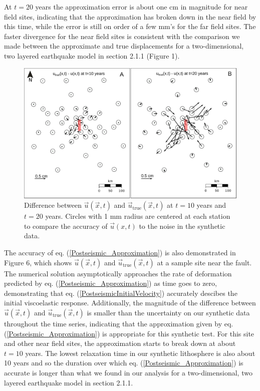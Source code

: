 \documentclass[extra]{gji}
\begin{document}
At $t=20$ years the approximation error is about
one cm in magnitude for near field sites, indicating that the
approximation has broken down in the near field by this time, while
the error is still on order of a few mm's for the far field
sites.  The faster divergence for the near field sites is consistent
with the comparison we made between the approximate and true
displacements for a two-dimensional, two layered earthquake model in
section 2.1.1 (Figure 1).

\begin{figure}\label{figure7}
  \centering
  \includegraphics[scale=0.6]{FinalFigures/Figure7.pdf}
  \caption{Difference between $\vec{u}(\vec{x},t)$ and
    $\vec{u}_{\mathrm{true}}(\vec{x},t)$ at $t=10$ years and $t=20$ years.
    Circles with 1 mm radius are centered at each station to compare
    the accuracy of $\vec{u}(x,t)$ to the noise in
    the synthetic data.}
  \label{Figure 7}
\end{figure}

The accuracy of eq. (\ref{Postseismic_Approximation}) is also
demonstrated in Figure 6, which shows $\vec{u}(\vec{x},t)$ and
$\vec{u}_{\mathrm{true}}(\vec{x},t)$ at a sample site near the fault.
The numerical solution asymptotically approaches the rate of
deformation predicted by eq. (\ref{Postseismic_Approximation}) as time
goes to zero, demonstrating that
eq. (\ref{PostseismicInitialVelocity}) accurately descibes the initial
viscoelastic response.  Additionally, the magnitude of the difference
between $\vec{u}(\vec{x},t)$ and $\vec{u}_{\mathrm{true}}(\vec{x},t)$
is smaller than the uncertainty on our synthetic data throughout the
time series, indicating that the approximation given by
eq. (\ref{Postseismic_Approximation}) is appropriate for this
synthetic test.  For this site and other near field sites, the
approximation starts to break down at about $t=10$ years. The lowest
relaxation time in our synthetic lithosphere is also about 10 years
and so the duration over which eq. (\ref{Postseismic_Approximation})
is accurate is longer than what we found in our analysis for a
two-dimensional, two layered earthquake model in section 2.1.1. 
\end{document}
